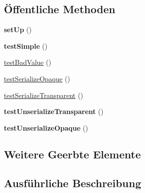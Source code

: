 \subsection*{Öffentliche Methoden}
\begin{DoxyCompactItemize}
\item 
\mbox{\label{class_sabre_1_1_cal_d_a_v_1_1_xml_1_1_property_1_1_schedule_calendar_transp_test_ac21551a7da6ed491a958bf486df8c99b}} 
{\bfseries set\+Up} ()
\item 
\mbox{\label{class_sabre_1_1_cal_d_a_v_1_1_xml_1_1_property_1_1_schedule_calendar_transp_test_a36e1c1f45c45ce29df33b5ab74c728ff}} 
{\bfseries test\+Simple} ()
\item 
\mbox{\hyperlink{class_sabre_1_1_cal_d_a_v_1_1_xml_1_1_property_1_1_schedule_calendar_transp_test_a55230d30dd2f9c79069a53f96180f2e5}{test\+Bad\+Value}} ()
\item 
\mbox{\hyperlink{class_sabre_1_1_cal_d_a_v_1_1_xml_1_1_property_1_1_schedule_calendar_transp_test_a8952b2eea1708823f8ecf0c0a827cc30}{test\+Serialize\+Opaque}} ()
\item 
\mbox{\hyperlink{class_sabre_1_1_cal_d_a_v_1_1_xml_1_1_property_1_1_schedule_calendar_transp_test_a1e49996d97d4aa63532ee68ea88581a5}{test\+Serialize\+Transparent}} ()
\item 
\mbox{\label{class_sabre_1_1_cal_d_a_v_1_1_xml_1_1_property_1_1_schedule_calendar_transp_test_a3e95b07974cdfcdf4c2f636c79481168}} 
{\bfseries test\+Unserialize\+Transparent} ()
\item 
\mbox{\label{class_sabre_1_1_cal_d_a_v_1_1_xml_1_1_property_1_1_schedule_calendar_transp_test_a5a8983164c48b083ab939f3cca2f2a4c}} 
{\bfseries test\+Unserialize\+Opaque} ()
\end{DoxyCompactItemize}
\subsection*{Weitere Geerbte Elemente}


\subsection{Ausführliche Beschreibung}


